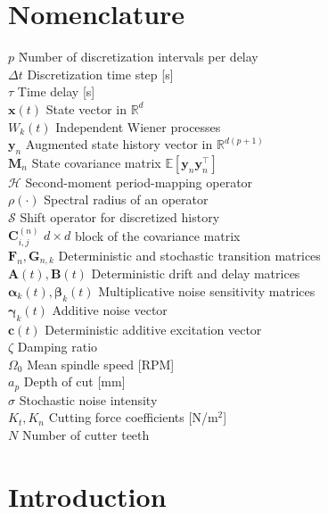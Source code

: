 \documentclass[preprint,12pt]{elsarticle}
\begin{document}
\section*{Nomenclature}
\begin{tabbing}
  $p$ \quad \= Number of discretization intervals per delay \\
  $\Delta t$ \> Discretization time step [s] \\
  $\tau$ \> Time delay [s] \\
  $\mathbf{x}(t)$ \> State vector in $\mathbb{R}^d$ \\
  $W_k(t)$ \> Independent Wiener processes \\
  $\mathbf{y}_n$ \> Augmented state history vector in $\mathbb{R}^{d(p+1)}$ \\
  $\mathbf{M}_n$ \> State covariance matrix $\mathbb{E}[\mathbf{y}_n \mathbf{y}_n^\top]$ \\
  $\mathcal{H}$ \> Second-moment period-mapping operator \\
  $\rho(\cdot)$ \> Spectral radius of an operator \\
  $\mathcal{S}$ \> Shift operator for discretized history \\
  $\mathbf{C}_{i,j}^{(n)}$ \> $d \times d$ block of the covariance matrix \\
  $\mathbf{F}_n, \mathbf{G}_{n,k}$ \> Deterministic and stochastic transition matrices \\
  $\mathbf{A}(t), \mathbf{B}(t)$ \> Deterministic drift and delay matrices \\
  $\boldsymbol{\alpha}_k(t), \boldsymbol{\beta}_k(t)$ \> Multiplicative noise sensitivity matrices \\
  $\boldsymbol{\gamma}_k(t)$ \> Additive noise vector \\
  $\mathbf{c}(t)$ \> Deterministic additive excitation vector \\
  $\zeta$ \> Damping ratio \\
  $\Omega_0$ \> Mean spindle speed [RPM] \\
  $a_p$ \> Depth of cut [mm] \\
  $\sigma$ \> Stochastic noise intensity \\
  $K_t, K_n$ \> Cutting force coefficients [N/m$^2$] \\
  $N$ \> Number of cutter teeth
\end{tabbing}

\section{Introduction}
\label{sec:intro}
\end{document}
